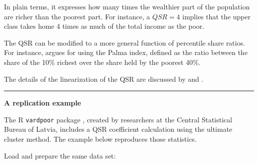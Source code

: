 \documentclass[
]{book}
\begin{document}
In plain terms, it expresses how many times the wealthier part of the population are richer than the poorest part. For instance, a \(QSR = 4\) implies that the upper class takes home 4 times as much of the total income as the poor.

The QSR can be modified to a more general function of percentile share ratios. For instance, \textcite{cobham2015} argues for using the Palma index, defined as the ratio between the share of the 10\% richest over the share held by the poorest 40\%.

The details of the linearization of the QSR are discussed by \textcite{deville1999} and \textcite{osier2009}.

\begin{center}\rule{0.5\linewidth}{0.5pt}\end{center}

\textbf{A replication example}

The R \texttt{vardpoor} package \autocite{vardpoor}, created by researchers at the Central Statistical Bureau of Latvia, includes a QSR coefficient calculation using the ultimate cluster method. The example below reproduces those statistics.

Load and prepare the same data set:
\end{document}
